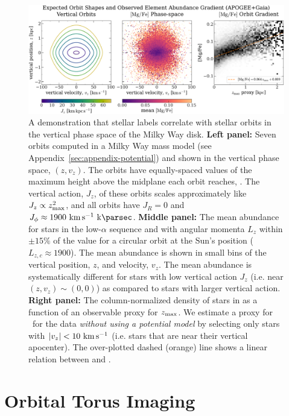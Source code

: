 \documentclass[modern]{aastex631}
\begin{document}
\begin{figure}[t!]
\begin{center}
\includegraphics[width=1\textwidth]{mgfe-zvz.pdf}
\end{center}
\caption{%
A demonstration that stellar labels correlate with stellar orbits in the vertical phase
space of the Milky Way disk.
\textbf{Left panel:} Seven orbits computed in a Milky Way mass model (see
Appendix~\ref{sec:appendix-potential}) and shown in the vertical phase space, $(z,
v_z)$.
The orbits have equally-spaced values of the maximum height above the midplane each
orbit reaches, \zmax.
The vertical action, $J_z$, of these orbits scales approximately like $J_z \propto
z_{\textrm{max}}^2$, and all orbits have $J_R=0$ and $J_\phi\approx 1900~\kms~\kpc$.
\textbf{Middle panel:} The mean  abundance for stars in the low-$\alpha$
sequence and with angular momenta $L_z$ within $\pm 15\%$ of the value for a circular
orbit at the Sun's position ($L_{z, c} \approx 1900$).
The mean  abundance is shown in small bins of the vertical position, $z$,
and velocity, $v_z$.
The mean abundance is systematically different for stars with low vertical action $J_z$
(i.e. near $(z, v_z) \sim (0, 0)$) as compared to stars with larger vertical action.
\textbf{Right panel:} The column-normalized density of stars in  as a
function of an observable proxy for $z_{\textrm{max}}$.
We estimate a proxy for \zmax\ for the data \emph{without using a potential model} by
selecting only stars with $|v_z| < 10~\kms$ (i.e. stars that are near their vertical
apocenter).
The over-plotted dashed (orange) line shows a linear relation between  and
\zmax.
\label{fig:mgfe-zvz}
}
\end{figure}


\section{Orbital Torus Imaging} \label{sec:oti}
\end{document}
